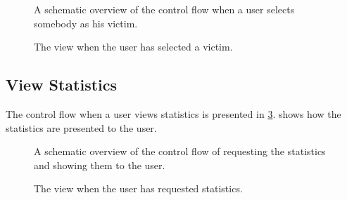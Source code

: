 		\begin{figure}
			\caption{A schematic overview of the control flow when a user selects somebody as his victim.}
			\label{fig:1:controlflowVictim}
		\end{figure}	

		\begin{figure}
				\caption{The view when the user has selected a victim.}
				\label{fig:1:viewVictim:selectedVictim}
		\end{figure}	

\subsection{View Statistics}
	The control flow when a user views statistics is presented in \cref{fig:1:controlflowStat}.  shows how the statistics are presented to the user.


	\begin{figure}
		\caption{A schematic overview of the control flow of requesting the statistics and showing them to the user.}
		\label{fig:1:controlflowStat}
	\end{figure}

	\begin{figure}
		\caption{The view when the user has requested statistics.}
		\label{fig:1:viewStat}
	\end{figure}